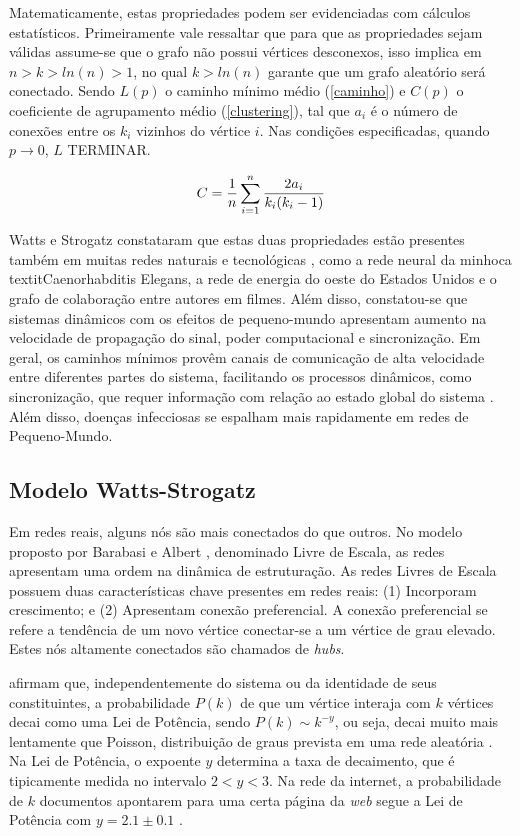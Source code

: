 Matematicamente, estas propriedades podem ser evidenciadas com cálculos estatísticos. Primeiramente vale ressaltar que para que as propriedades sejam válidas assume-se que o grafo não possui vértices desconexos, isso implica em $n > k > ln(n) > 1$, no qual $k > ln(n)$ garante que um grafo aleatório será conectado. Sendo $L(p)$ o caminho mínimo médio (\ref{caminho}) e $C(p)$ o coeficiente de agrupamento médio (\ref{clustering}), tal que $a_i$ é o número de conexões entre os $k_i$ vizinhos do vértice $i$. Nas condições especificadas, quando $p \rightarrow 0$, $L$ TERMINAR.

\begin{equation}
  C = \frac{1}{n} \sum_{i = 1}^{n}\frac{2a_i}{k_i(k_i - 1)}\\
  \label{clustering}
\end{equation}

Watts e Strogatz constataram que estas duas propriedades estão presentes também em muitas redes naturais e tecnológicas \cite{watts1998collective}, como a rede neural da minhoca textit{Caenorhabditis Elegans}, a rede de energia do oeste do Estados Unidos e o grafo de colaboração entre autores em filmes. Além disso, constatou-se que sistemas dinâmicos com os efeitos de pequeno-mundo apresentam aumento na velocidade de propagação do sinal, poder computacional e sincronização. Em geral, os caminhos mínimos provêm canais de comunicação de alta velocidade entre diferentes partes do sistema, facilitando os processos dinâmicos, como sincronização, que requer informação com relação ao estado global do sistema \cite{strogatz2001exploring}. Além disso, doenças infecciosas se espalham mais rapidamente em redes de Pequeno-Mundo.

\subsection{Modelo Watts-Strogatz}

Em redes reais, alguns nós são mais conectados do que outros. No modelo proposto por Barabasi e Albert \cite{barabasi1999emergence}, denominado Livre de Escala, as redes apresentam uma ordem na dinâmica de estruturação. As redes Livres de Escala possuem duas características chave presentes em redes reais: (1) Incorporam crescimento; e (2) Apresentam conexão preferencial. A conexão preferencial se refere a tendência de um novo vértice conectar-se a um vértice de grau elevado. Estes nós altamente conectados são chamados de \textit{hubs}.

\cite{barabasi1999emergence} afirmam que, independentemente do sistema ou da identidade de seus constituintes, a probabilidade $P(k)$ de que um vértice interaja com $k$ vértices decai como uma Lei de Potência, sendo $P(k) \sim k^{-y}$, ou seja, decai muito mais lentamente que Poisson, distribuição de graus prevista em uma rede aleatória \cite{strogatz2001exploring}. Na Lei de Potência, o expoente $y$ determina a taxa de decaimento, que é tipicamente medida no intervalo $2 < y < 3$. Na rede da internet, a probabilidade de $k$ documentos apontarem para uma certa página da \textit{web} segue a Lei de Potência com $y = 2.1 \pm 0.1$ \cite{barabasi1995emergence}. 

